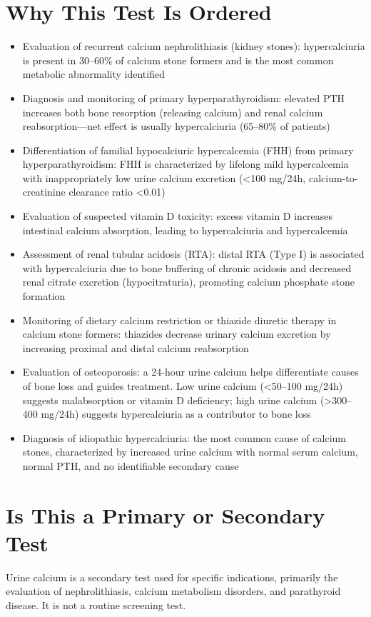 \section*{Why This Test Is Ordered}
\begin{itemize}
  \item Evaluation of recurrent calcium nephrolithiasis (kidney stones): hypercalciuria is present in 30--60\% of calcium stone formers and is the most common metabolic abnormality identified
  \item Diagnosis and monitoring of primary hyperparathyroidism: elevated PTH increases both bone resorption (releasing calcium) and renal calcium reabsorption---net effect is usually hypercalciuria (65--80\% of patients)
  \item Differentiation of familial hypocalciuric hypercalcemia (FHH) from primary hyperparathyroidism: FHH is characterized by lifelong mild hypercalcemia with inappropriately low urine calcium excretion (<100 mg/24h, calcium-to-creatinine clearance ratio <0.01)
  \item Evaluation of suspected vitamin D toxicity: excess vitamin D increases intestinal calcium absorption, leading to hypercalciuria and hypercalcemia
  \item Assessment of renal tubular acidosis (RTA): distal RTA (Type I) is associated with hypercalciuria due to bone buffering of chronic acidosis and decreased renal citrate excretion (hypocitraturia), promoting calcium phosphate stone formation
  \item Monitoring of dietary calcium restriction or thiazide diuretic therapy in calcium stone formers: thiazides decrease urinary calcium excretion by increasing proximal and distal calcium reabsorption
  \item Evaluation of osteoporosis: a 24-hour urine calcium helps differentiate causes of bone loss and guides treatment. Low urine calcium (<50--100 mg/24h) suggests malabsorption or vitamin D deficiency; high urine calcium (>300--400 mg/24h) suggests hypercalciuria as a contributor to bone loss
  \item Diagnosis of idiopathic hypercalciuria: the most common cause of calcium stones, characterized by increased urine calcium with normal serum calcium, normal PTH, and no identifiable secondary cause
\end{itemize}

\section*{Is This a Primary or Secondary Test}
Urine calcium is a secondary test used for specific indications, primarily the evaluation of nephrolithiasis, calcium metabolism disorders, and parathyroid disease. It is not a routine screening test.

